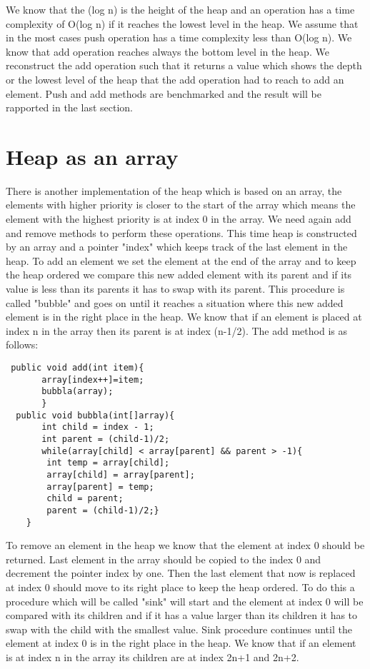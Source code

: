 \documentclass[a4paper,11pt]{article}
\begin{document}
We know that the (log n) is the height of the heap and an operation has a time complexity of O(log n) if it reaches the lowest level in the heap. We assume that in the most cases push operation has a time complexity less than O(log n). We know that add operation reaches always the bottom level in the heap. We reconstruct the add operation such that it returns a value which shows the depth or the lowest level of the heap that the add operation had to reach to add an element. Push and add methods are benchmarked and the result will be rapported in the last section.          

\section*{Heap as an array}
There is another implementation of the heap which is based on an array, the elements with higher priority is closer to the start of the array which means the element with the highest priority is at index 0 in the array. We need again add and remove methods to perform these operations. This time heap is constructed by an array and a pointer "index" which keeps track of the last element in the heap. To add an element we set the element at the end of the array and to keep the heap ordered we compare this new added element with its parent and if its value is less than its parents it has to swap with its parent. This procedure is called "bubble" and goes on until it reaches a situation where this new added element is in the right place in the heap. We know that if an element is placed at index n in the array then its parent is at index (n-1/2). The add method is as follows:

\begin{verbatim}
 public void add(int item){
       array[index++]=item;
       bubbla(array); 
       }
  public void bubbla(int[]array){
       int child = index - 1;
       int parent = (child-1)/2;
       while(array[child] < array[parent] && parent > -1){
        int temp = array[child];
        array[child] = array[parent];
        array[parent] = temp;
        child = parent;
        parent = (child-1)/2;}
    }
\end{verbatim}  

To remove an element in the heap we know that the element at index 0 should be returned. Last element in the array should be copied to the index 0 and decrement the pointer index by one. Then the last element that now is replaced at index 0 should move to its right place to keep the heap ordered. To do this a procedure which will be called "sink" will start and the element at index 0 will be compared with its children and if it has a value larger than its children it has to swap with the child with the smallest value. Sink procedure continues until the element at index 0 is in the right place in the heap. We know that if an element is at index n in the array its children are at index 2n+1 and 2n+2.
\end{document}
